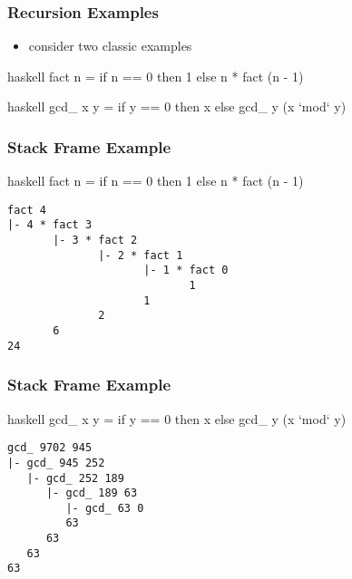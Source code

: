 \documentclass[dvipsnames]{beamer}
\theoremstyle{plain}
\begin{document}
\begin{frame}[fragile]
  \frametitle{Recursion Examples}

  \begin{itemize}
    \item consider two classic examples
  \end{itemize}

  \begin{example}
    \begin{pygments}{haskell}
fact n =
    if n == 0
    then 1
    else n * fact (n - 1)
    \end{pygments}
  \end{example}

  \begin{example}
    \begin{pygments}{haskell}
gcd_ x y =
    if y == 0
    then x
    else gcd_ y (x `mod` y)
    \end{pygments}
  \end{example}
\end{frame}

\begin{frame}[fragile]
  \frametitle{Stack Frame Example}

  \begin{example}[fact]
    \begin{pygments}{haskell}
fact n =
    if n == 0 then 1
    else n * fact (n - 1)
    \end{pygments}

    \pause
    \begin{verbatim}
fact 4
|- 4 * fact 3
       |- 3 * fact 2
              |- 2 * fact 1
                     |- 1 * fact 0
                            1
                     1
              2
       6
24
    \end{verbatim}
  \end{example}
\end{frame}

\begin{frame}[fragile]
  \frametitle{Stack Frame Example}

  \begin{example}[gcd\_]
    \begin{pygments}{haskell}
gcd_ x y =
    if y == 0 then x
    else gcd_ y (x `mod` y)
    \end{pygments}

    \pause
    \begin{verbatim}
gcd_ 9702 945
|- gcd_ 945 252
   |- gcd_ 252 189
      |- gcd_ 189 63
         |- gcd_ 63 0
         63
      63
   63
63
    \end{verbatim}
  \end{example}
\end{frame}
\end{document}
